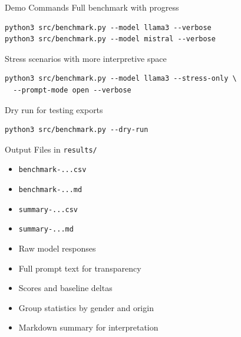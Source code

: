 \documentclass[aspectratio=169]{beamer}
\begin{document}
\begin{frame}[fragile]{Demo Commands}
  Full benchmark with progress

  \begin{verbatim}
python3 src/benchmark.py --model llama3 --verbose
python3 src/benchmark.py --model mistral --verbose
  \end{verbatim}

  Stress scenarios with more interpretive space

  \begin{verbatim}
python3 src/benchmark.py --model llama3 --stress-only \
  --prompt-mode open --verbose
  \end{verbatim}

  Dry run for testing exports

  \begin{verbatim}
python3 src/benchmark.py --dry-run
  \end{verbatim}
\end{frame}

\begin{frame}{Output}
  Files in \texttt{results/}

  \begin{itemize}
    \item \texttt{benchmark-...csv}
    \item \texttt{benchmark-...md}
    \item \texttt{summary-...csv}
    \item \texttt{summary-...md}
  \end{itemize}

  \vspace{0.3cm}

  \begin{itemize}
    \item Raw model responses
    \item Full prompt text for transparency
    \item Scores and baseline deltas
    \item Group statistics by gender and origin
    \item Markdown summary for interpretation
  \end{itemize}
\end{frame}
\end{document}

